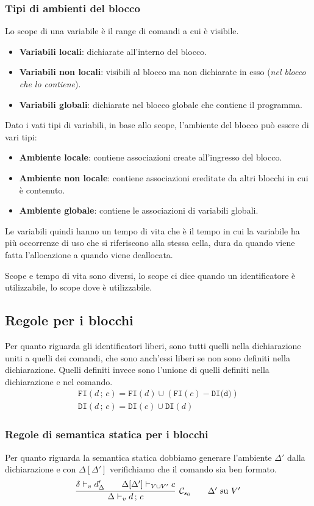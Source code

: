 \documentclass[oneside,a4paper,11pt]{book}
\theoremstyle{italicstyle}
\theoremstyle{normStyle}
\begin{document}
\subsubsection{Tipi di ambienti del blocco}
Lo scope di una variabile è il range di comandi a cui è visibile.
\begin{itemize}
  \item \textbf{Variabili locali}: dichiarate all'interno del blocco.
  \item \textbf{Variabili non locali}: visibili al blocco ma non 
  dichiarate in esso (\textit{nel blocco che lo contiene}).
  \item \textbf{Variabili globali}: dichiarate nel blocco globale che contiene il 
  programma.
\end{itemize}
Dato i vati tipi di variabili, in base allo scope, l'ambiente del blocco può essere di 
vari tipi:
\begin{itemize}
  \item \textbf{Ambiente locale}: contiene associazioni create all'ingresso del blocco.
  \item \textbf{Ambiente non locale}: contiene associazioni ereditate da altri blocchi in cui è contenuto.
  \item \textbf{Ambiente globale}: contiene le associazioni di variabili globali.
\end{itemize}
Le variabili quindi hanno un tempo di vita che è il tempo in cui la variabile ha più occorrenze di uso che si riferiscono 
alla stessa cella, dura da quando viene fatta l'allocazione a quando viene deallocata.

Scope e tempo di vita sono diversi, lo scope ci dice quando un identificatore è utilizzabile, 
lo scope dove è utilizzabile.
\subsection{Regole per i blocchi}
Per quanto riguarda gli identificatori liberi, sono tutti quelli nella 
dichiarazione uniti a quelli dei comandi, che sono anch'essi liberi se non sono definiti 
nella dichiarazione. Quelli definiti invece sono l'unione di quelli definiti nella dichiarazione e nel comando.
\begin{align*}
  \texttt{FI}(d\,;\,c) = \texttt{FI}(d) \cup (\texttt{FI}(c) - \texttt{DI(d)})\\
  \texttt{DI}(d\,;\,c)= \texttt{DI}(c) \cup \texttt{DI}(d)
\end{align*}
\subsubsection{Regole di semantica statica per i blocchi}
Per quanto riguarda la semantica statica dobbiamo generare l'ambiente $\Delta'$
dalla dichiarazione e con $\Delta[\Delta']$ verifichiamo che il comando sia ben formato.
\[
  \infer[\mathcal{C}_{s_6}\qquad \Delta' \text{ su }V']
  {
  \Delta \vdash_v d\,;\,c
  }
  {
    \delta \vdash_v d_\Delta'\qquad\Delta[\Delta']\vdash_{V \cup V'} c
  }
\]
\end{document}
